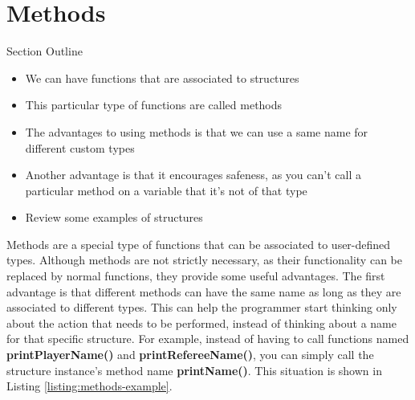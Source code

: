 \documentclass[11pt,fleqn,openany]{book} %
\begin{document}


\section{Methods}

\begin{remark}
Section Outline
    \begin{itemize}
    	\item We can have functions that are associated to structures
        \item This particular type of functions are called methods
        \item The advantages to using methods is that we can use a same name for different custom types
        \item Another advantage is that it encourages safeness, as you can't call a particular method on a variable that it's not of that type
        \item Review some examples of structures
    \end{itemize}
\end{remark}

Methods are a special type of functions that can be associated to user-defined types. Although methods are not strictly necessary, as their functionality can be replaced by normal functions, they provide some useful advantages. The first advantage is that different methods can have the same name as long as they are associated to different types. This can help the programmer start thinking only about the action that needs to be performed, instead of thinking about a name for that specific structure. For example, instead of having to call functions named \textbf{printPlayerName()} and \textbf{printRefereeName()}, you can simply call the structure instance's method name \textbf{printName()}. This situation is shown in Listing \ref{listing:methods-example}.

\end{document}

